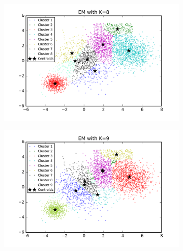 \begin{description}
\begin{description}
\begin{figure}[!h]
\begin{subfigure}[b]{0.475\textwidth}
        \end{subfigure}
        \hfill
        \begin{subfigure}[b]{0.475\textwidth}  
            \centering 
            \includegraphics[width=\textwidth]{./figures/bigClustering_EM_8.png}
        \end{subfigure}
        \begin{subfigure}[b]{0.475\textwidth}   
            \centering 
            \includegraphics[width=\textwidth]{./figures/bigClustering_EM_9.png}
        \end{subfigure}
        \hfill
        \begin{subfigure}[b]{0.475\textwidth}   
            \centering 

\end{subfigure}
\end{figure}
\end{description}
\end{description}
